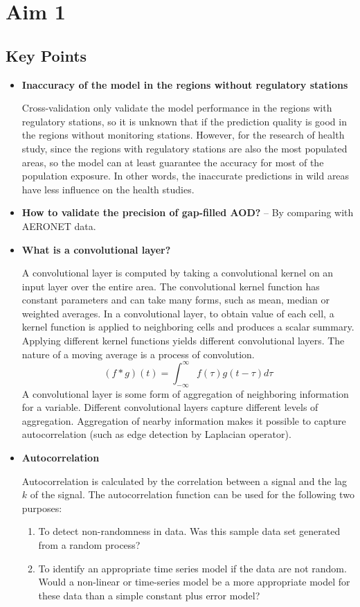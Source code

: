 \documentclass{article}
\begin{document}
\section{Aim 1}
\subsection{Key Points}
\begin{itemize}
    \item \textbf{Inaccuracy of the model in the regions without regulatory stations}{
    
    Cross-validation only validate the model performance in the regions with regulatory stations, so it is unknown that if the prediction quality is good in the regions without monitoring stations. However, for the research of health study, since the regions with regulatory stations are also the most populated areas, so the model can at least guarantee the accuracy for most of the population exposure. In other words, the inaccurate predictions in wild areas have less influence on the health studies. 
    }
    \item \textbf{How to validate the precision of gap-filled AOD?} -- By comparing with AERONET data.
    \item \textbf{What is a convolutional layer?} {
    
    A convolutional layer is computed by taking a convolutional kernel on an input layer over the entire area. The convolutional kernel function has constant parameters and can take many forms, such as mean, median or weighted averages. In a convolutional layer, to obtain value of each cell, a kernel function is applied to neighboring cells and produces a scalar summary. Applying different kernel functions yields different convolutional layers. The nature of a moving average is a process of convolution. 
    \begin{equation*}
        (f*g)(t)=\int_{-\infty}^{\infty}f(\tau)g(t-\tau)d\tau
    \end{equation*}
    A convolutional layer is some form of aggregation of neighboring information for a variable. Different convolutional layers capture different levels of aggregation. Aggregation of nearby information makes it possible to capture autocorrelation (such as edge detection by Laplacian operator). 
    }
    \item \textbf{Autocorrelation} {
    
    Autocorrelation is calculated by the correlation between a signal and the lag $k$ of the signal. The autocorrelation function can be used for the following two purposes:
    \begin{enumerate}
        \item To detect non-randomness in data. Was this sample data set generated from a random process?
        \item To identify an appropriate time series model if the data are not random. Would a non-linear or time-series model be a more appropriate model for these data than a simple constant plus error model?
    \end{enumerate}
    }
\end{itemize}
\end{document}
